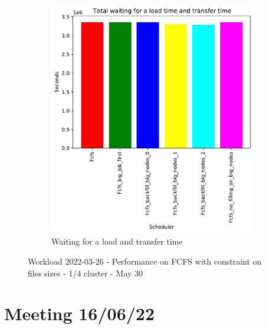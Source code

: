 \documentclass[a4paper]{article}
\begin{document}
\begin{figure}[H]
	\begin{subfigure}[b]{0.4\linewidth}\centering\includegraphics[width=1\linewidth]{MBSS/plot/Size_Constraint_2022-03-26->2022-03-26_Total_waiting_for_a_load_time_and_transfer_time_95_128_4_256_1_1024.pdf}\caption{Waiting for a load and transfer time}\end{subfigure}\caption{Workload 2022-03-26 - Performance on FCFS with constraint on files sizes - 1/4 cluster - May 30}\end{figure}


\section{Meeting 16/06/22}
\end{document}
